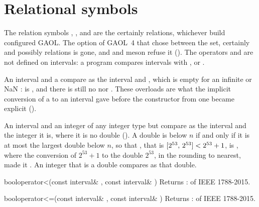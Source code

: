 \documentclass[12pt,a4paper,twoside,openright]{book}
\begin{document}
\section{Relational symbols}\label{sec:relational-symbols}
%

The relation symbols \code{<}, \code{<=}, \code{>} and \code{>=} are the
certainly relations, whichever build configured GAOL. The option of GAOL~4
that chose between the set, certainly and possibly relations is gone, and
 and meson refuse it ().\newinvfive{}
The operators \code{==} and \code{!=} are not defined on intervals: a program
compares intervals with ,  or
.

\medskip
An interval and a   compare as the interval and
, which is empty for an infinite or NaN :
 is , and there is still no \code{==}
nor \code{!=}. These overloads are what the implicit conversion of a
 to an interval gave before the constructor from one
 became explicit ().\newinvfive

\medskip
An interval and an integer  of any integer type but 
compare as the interval and the integer it is, where it is no double
(). A double is below $n$ if and only if it is at most
the largest double below $n$, so that
, that is
$[2^{53},\,2^{53}] < 2^{53}+1$, is , where the conversion of
$2^{53}+1$ to the double $2^{53}$, in the rounding to nearest, made it
. An integer that is a double compares as that
double.\newinvfive

\begin{deffun}{bool}{operator<}{(const interval\& , const interval\& )}
  Returns :  of
  IEEE 1788-2015.
\end{deffun}

\begin{deffun}{bool}{operator<=}{(const interval\& , const interval\& )}
  Returns :  of
  IEEE 1788-2015.
\end{deffun}
\end{document}
